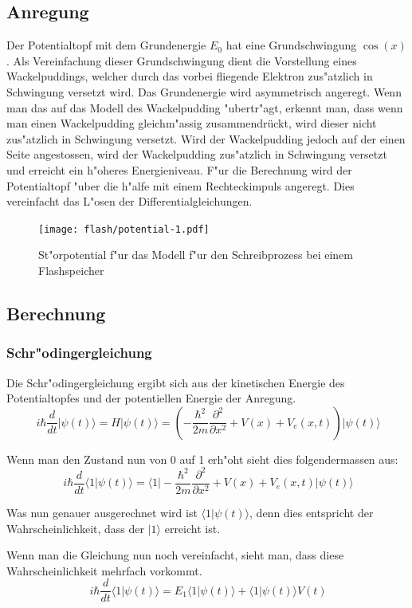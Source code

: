 \begin{refsection}
\subsection{Anregung}
Der Potentialtopf mit dem Grundenergie $E_{0}$ hat eine Grundschwingung
$\cos(x)$.  Als Vereinfachung dieser Grundschwingung dient die
Vorstellung eines Wackelpuddings, welcher durch das vorbei fliegende
Elektron zus"atzlich in Schwingung versetzt wird.  Das Grundenergie
wird asymmetrisch angeregt. Wenn man das auf das Modell des
Wackelpudding "ubertr"agt, erkennt man, dass wenn man einen Wackelpudding
gleichm"assig zusammendrückt, wird dieser nicht zus"atzlich in Schwingung
versetzt. Wird der Wackelpudding jedoch auf der einen Seite angestossen,
wird der Wackelpudding zus"atzlich in Schwingung versetzt und erreicht
ein h"oheres Energieniveau.  F"ur die Berechnung wird der Potentialtopf
"uber die h"alfe mit einem Rechteckimpuls angeregt. Dies vereinfacht
das L"osen der Differentialgleichungen.

\begin{figure}
\centering
\texttt{[image: flash/potential-1.pdf]}
\caption{St"orpotential f"ur das Modell f"ur den Schreibprozess bei
einem Flashspeicher}
\end{figure}

\subsection{Berechnung}
\subsubsection{Schr"odingergleichung}

Die Schr"odingergleichung ergibt sich aus der kinetischen Energie des
Potentialtopfes und der potentiellen Energie der Anregung.
\[
\ i\hbar\frac{d}{dt}|\psi(t)\rangle = H|\psi(t)\rangle = (-\frac{\hbar^2}{2m} \frac{\partial^2}{\partial x^2}+V(x)+V_{e}(x,t))|\psi(t)\rangle
\]

Wenn man den Zustand nun von 0 auf 1 erh"oht sieht dies folgendermassen aus:
\[
\ i\hbar\frac{d}{dt}\langle1|\psi(t)\rangle = \langle1|-\frac{\hbar^2}{2m} \frac{\partial^2}{\partial x^2}+V(x)+V_{e}(x,t)|\psi(t)\rangle
\]

Was nun genauer ausgerechnet wird ist $\langle1|\psi(t)\rangle$, denn
dies entspricht der Wahrscheinlichkeit, dass der $|1\rangle$ erreicht ist.

Wenn man die Gleichung nun noch vereinfacht, sieht man, dass diese
Wahrscheinlichkeit mehrfach vorkommt.
\[
\ i\hbar\frac{d}{dt}\langle1|\psi(t)\rangle = E_{1}\langle1|\psi(t)\rangle+\langle1|\psi(t)\rangle V(t)
\]


\end{refsection}
